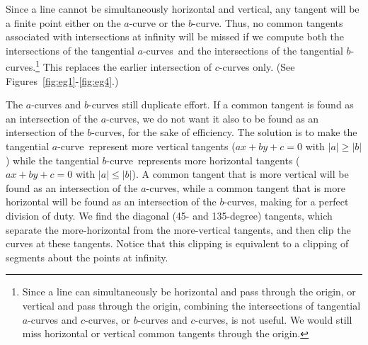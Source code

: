 \documentclass[9pt,twocolumn]{article}
\newif\ifTalk
\newcommand{\atang}{tangential $a$-curve\ }
\newcommand{\btang}{tangential $b$-curve\ }
\newcommand{\atangs}{tangential $a$-curves\ }
\begin{document}
Since a line cannot be simultaneously horizontal and vertical, 
any tangent will be a finite point either on the $a$-curve or the $b$-curve.
Thus, no common tangents associated with intersections at 
infinity will be missed if we compute both the intersections of the \atangs and
the intersections of the tangential $b$-curves.\footnote{Since a line can simultaneously be horizontal 
	and pass through the origin, or vertical and pass through the origin,
	combining the intersections of tangential $a$-curves and $c$-curves,
	or $b$-curves and $c$-curves, is not useful.
	We would still miss horizontal or vertical common tangents through the origin.}
This replaces the earlier intersection of $c$-curves only.
(See Figures~\ref{fig:eg1}-\ref{fig:eg4}.)
\ifTalk
The $a$-curves and $b$-curves cooperate to find all of the common tangents.
each individually has a blind spot, but together they see everything.
much like the three Fates that share an eyeball.
WANT NO MUTUALLY BLIND PARAMETER INTERVALS
We shall clip out a segment of a tangential curve about its point at infinity.
We must take care that the parameter interval of a clipped segment 
of one curve (when the curve is blind to common tangents) does not
overlap a parameter interval of a clipped segment of the other curve,
which would create a mutually blind interval where a common tangent
could be missed.
This is simply a matter of guaranteeing that the parameter intervals
of the clipped segments (blind regions) on both curves are kept disjoint.
\fi

The $a$-curves and $b$-curves still duplicate effort.
If a common tangent is found as an intersection of the $a$-curves,
we do not want it also to be found as an intersection of the $b$-curves,
for the sake of efficiency.
The solution is to make the \atang represent more vertical tangents
($ax+by+c=0$ with $|a| \geq |b|$)
while the \btang represents more horizontal tangents
($ax+by+c=0$ with $|a| \leq |b|$).
A common tangent that is more vertical will be found as an
intersection of the $a$-curves, while a common tangent that is more
horizontal will be found as an intersection of the $b$-curves,
making for a perfect division of duty.
We find the diagonal (45- and 135-degree) tangents,
which separate the more-horizontal from the more-vertical tangents,
and then clip the curves at these tangents.
Notice that this clipping is equivalent to a clipping of segments
about the points at infinity.
\end{document}
